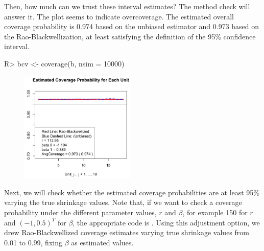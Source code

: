\documentclass[article]{jss}
\begin{document}
Then, how much can we trust these interval estimates? The method check will answer it. The plot seems to indicate overcoverage. The estimated overall coverage probability is 0.974 based on the unbiased estimator and 0.973 based on the Rao-Blackwellization, at least satisfying the definition of the 95\% confidence interval. 
\begin{CodeChunk}
\begin{CodeInput}
R> bcv <- coverage(b, nsim = 10000)
\end{CodeInput}
\end{CodeChunk}
\begin{figure}[h]
\begin{center}
\includegraphics[width = 5.5cm]{baseball2.png}
\end{center}
\end{figure}

Next, we will check whether the estimated coverage probabilities are at least 95\% varying the true shrinkage values. Note that, if we want to check a coverage probability under the different parameter values, $r$ and $\beta$, for example 150 for $r$ and $(-1, 0.5)^{T}$ for $\beta$, the appropriate code is . Using this adjustment option, we drew Rao-Blackwellized coverage estimates varying true shrinkage values from 0.01 to 0.99, fixing $\beta$ as estimated values.
\\
\end{document}
